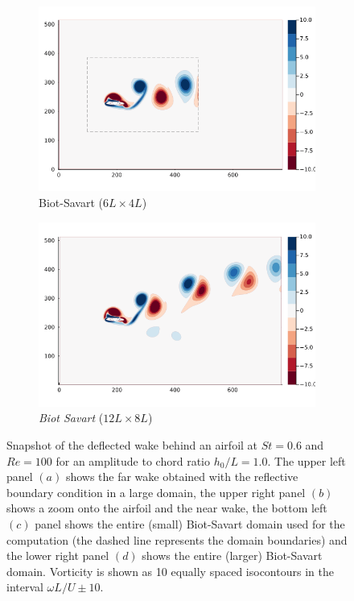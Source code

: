 \documentclass[preprint,12pt]{elsarticle}
\begin{document}
\begin{figure}
\begin{subfigure}{.48\textwidth}
        \includegraphics[trim={2.8cm 2cm 4cm 2cm},clip,width=\textwidth]{tex//fig/Deflected_wake_snap_BS.png}
        \caption{Biot-Savart ($6L\times4L$)}
    \end{subfigure}%
    \hspace{0.1cm}
    \begin{subfigure}{.48\textwidth}
        \centering
        \includegraphics[trim={2.8cm 2cm 4cm 2cm},clip,width=\textwidth]{tex//fig/Deflected_wake_snap_BS_2x.png}
        \caption{\emph{Biot Savart} ($12L\times8L$)}
    \end{subfigure}
    \caption{Snapshot of the deflected wake behind an airfoil at $St=0.6$ and $Re=100$ for an amplitude to chord ratio $h_0/L=1.0$. The upper left panel $(a)$ shows the far wake obtained with the reflective boundary condition in a large domain, the upper right panel $(b)$ shows a zoom onto the airfoil and the near wake, the bottom left $(c)$ panel shows the entire (small) Biot-Savart domain used for the computation (the dashed line represents the domain boundaries) and the lower right panel $(d)$ shows the entire (larger) Biot-Savart domain. Vorticity is shown as 10 equally spaced isocontours in the interval $\omega L/U \pm 10$.}
    \label{fig:deflected_wake}
\end{figure}
\end{document}
